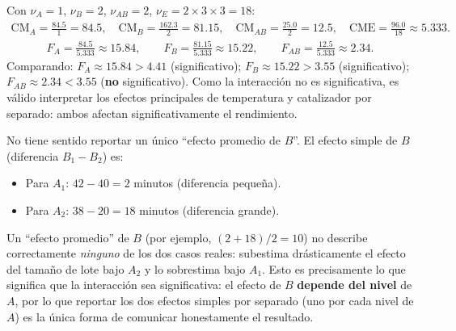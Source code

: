 \begin{solproblema}[prob:414074b]
	Con $\nu_A = 1$, $\nu_B = 2$, $\nu_{AB} = 2$, $\nu_E = 2 \times 3 \times 3 = 18$:
	\begin{align}
		\text{CM}_A = \frac{84.5}{1} = 84.5, \quad \text{CM}_B = \frac{162.3}{2} = 81.15, \quad \text{CM}_{AB} = \frac{25.0}{2} = 12.5, \quad \text{CME} = \frac{96.0}{18} \approx 5.333.
	\end{align}
	\begin{align}
		F_A = \frac{84.5}{5.333} \approx 15.84, \qquad F_B = \frac{81.15}{5.333} \approx 15.22, \qquad F_{AB} = \frac{12.5}{5.333} \approx 2.34.
	\end{align}
	Comparando: $F_A \approx 15.84 > 4.41$ (significativo); $F_B \approx 15.22 > 3.55$ (significativo); $F_{AB} \approx 2.34 < 3.55$ (\textbf{no} significativo). Como la interacción no es significativa, es válido interpretar los efectos principales de temperatura y catalizador por separado: ambos afectan significativamente el rendimiento.
\end{solproblema}

\begin{solproblema}[prob:64cf64c]
	No tiene sentido reportar un único ``efecto promedio de $B$''. El efecto simple de $B$ (diferencia $B_1 - B_2$) es:
	\begin{itemize}
		\item Para $A_1$: $42 - 40 = 2$ minutos (diferencia pequeña).
		\item Para $A_2$: $38 - 20 = 18$ minutos (diferencia grande).
	\end{itemize}
	Un ``efecto promedio'' de $B$ (por ejemplo, $(2+18)/2 = 10$) no describe correctamente \emph{ninguno} de los dos casos reales: subestima drásticamente el efecto del tamaño de lote bajo $A_2$ y lo sobrestima bajo $A_1$. Esto es precisamente lo que significa que la interacción sea significativa: el efecto de $B$ \textbf{depende del nivel} de $A$, por lo que reportar los dos efectos simples por separado (uno por cada nivel de $A$) es la única forma de comunicar honestamente el resultado.
\end{solproblema}

